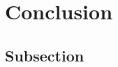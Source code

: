 \documentclass[main]{subfiles}
\begin{document}
\section{Conclusion}

\subsection{Subsection}
\end{document}
